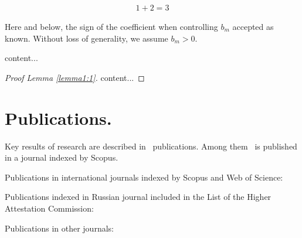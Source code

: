 \begin{align} %
	1+2=3
\end{align}

\begin{assumption-syn-en}
	Here and below, the sign of the coefficient when controlling $b_m$
	accepted as known. Without loss of generality, we assume $b_m >0$.
\end{assumption-syn-en}
\begin{lemma-syn-en} \label{lemma1:1}
	content...
\end{lemma-syn-en}

\begin{proof}[Proof Lemma \ref{lemma1:1}]
	content...
\end{proof}

\section*{Publications.}

Key results of research are described in \theAllMyPapers~publications. 
Among them
\theScopusPapers~is published in a journal indexed by Scopus. 



Publications in international journals indexed by Scopus and Web of Science:
\printPapperScopus

Publications indexed in Russian journal included in the List of the Higher Attestation Commission: 

Publications in other journals:
\printPapperOther
